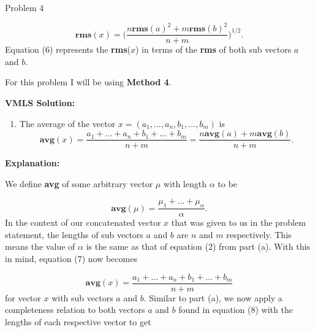 \begin{problem}{Problem 4}
\begin{Highlight}
        \begin{equation}
            \mathbf{rms}(x) = \Bigg(\frac{n\mathbf{rms}(a)^{2} + m\mathbf{rms}(b)^{2}}{n+m} \Bigg)^{1/2}.
        \end{equation}
        Equation (6) represents the \textbf{rms}($x$) in terms of the \textbf{rms} of both sub vectors $a$ and $b$.
    \end{Highlight}

    \begin{Highlight}
        For this problem I will be using \textbf{Method 4}. \vspace*{1em}

        \textbf{VMLS Solution:}

        \begin{enumerate}[label=(\alph*), start=2]
            \item The average of the vector $x = (a_{1}, \dots, a_{n}, b_{1}, \dots, b_{m})$ is
            \begin{equation*}
                \mathbf{avg}(x) = \frac{a_{1} + \dots + a_{n} + b_{1} + \dots + b_{m}}{n + m} = \frac{n\mathbf{avg}(a) + m\mathbf{avg}(b)}{n + m}.
            \end{equation*}
        \end{enumerate}

        \textbf{Explanation:} \vspace*{1em}

        We define \textbf{avg} of some arbitrary vector $\mu$ with length $\alpha$ to be 

        \begin{equation}
            \mathbf{avg}(\mu) = \frac{\mu_{1} + \dots + \mu_{\alpha}}{\alpha}.
        \end{equation}
        In the context of our concatenated vector $x$ that was given to us in the problem statement, the lengths of sub vectors $a$ and $b$ are $n$ and $m$ respectively. This means the value of $\alpha$
        is the same as that of equation (2) from part (a). With this in mind, equation (7) now becomes 

        \begin{equation}
            \mathbf{avg}(x) = \frac{a_{1} + \dots + a_{n} + b_{1} + \dots + b_{m}}{n + m}
        \end{equation}
        for vector $x$ with sub vectors $a$ and $b$. Similar to part (a), we now apply a completeness relation to both vectors $a$ and $b$ found in equation (8) with the lengths of each respective vector
        to get


\end{Highlight}
\end{problem}
